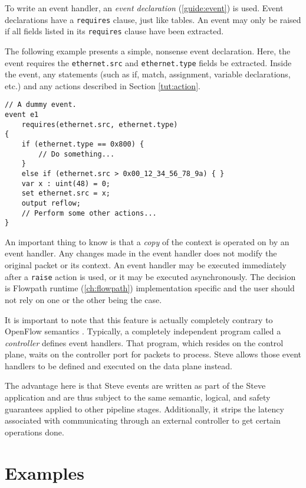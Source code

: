 To write an event handler, an \textit{event declaration}
(\ref{guide:event}) is used. Event declarations have a \texttt{requires} clause, just
like tables. An event may only be raised if all fields listed in its
\texttt{requires} clause have been extracted.

The following example presents a simple, nonsense event declaration. Here,
the event requires the \texttt{ethernet.src} and \texttt{ethernet.type} fields
be extracted. Inside the event, any statements (such as if, match,
assignment, variable declarations, etc.) and any actions described in Section
\ref{tut:action}.

\begin{codepage}
\begin{lstlisting}
// A dummy event.
event e1
	requires(ethernet.src, ethernet.type)
{
	if (ethernet.type == 0x800) {
		// Do something...
	}
	else if (ethernet.src > 0x00_12_34_56_78_9a) { }
	var x : uint(48) = 0;
	set ethernet.src = x;
	output reflow;
	// Perform some other actions...
}
\end{lstlisting}
\end{codepage}

An important thing to know is that a \textit{copy} of the context is operated on
by an event handler. Any changes made in the event handler does not modify the
original packet or its context. An event handler may be executed immediately
after a \texttt{raise} action is used, or it may be executed asynchronously. The decision
is Flowpath runtime (\ref{ch:flowpath}) implementation specific and the user should not
rely on one or the other being the case.

It is important to note that this feature is actually completely contrary to OpenFlow semantics
\cite{openflow_spec}. Typically, a completely independent program called a \textit{controller} defines event
handlers. That program, which resides on the control plane, waits on the controller port for packets to process.
Steve allows those event handlers to be defined and executed on the data plane instead.

The advantage here is that Steve events are written as part of the Steve
application and are thus subject to the same semantic, logical, and safety
guarantees applied to other pipeline stages. Additionally, it strips the latency associated with communicating through an external controller to get certain operations done.

\section{Examples} \label{tut:examples}

